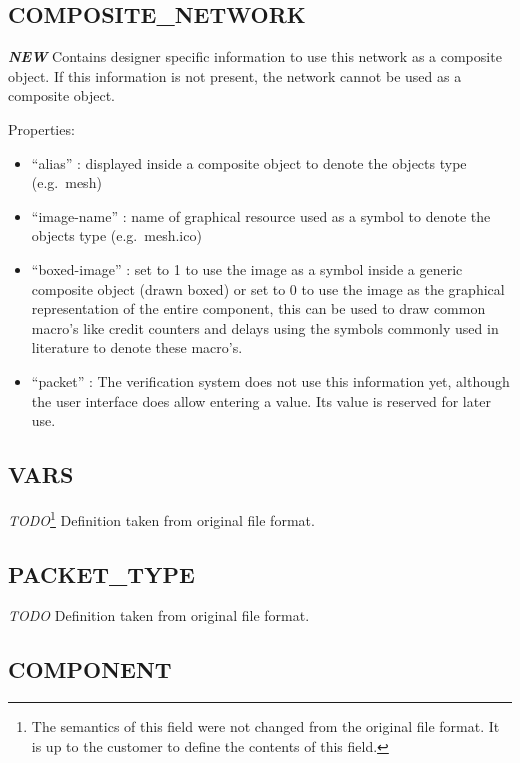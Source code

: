 \subsection{COMPOSITE\_NETWORK}\label{compositeux5fnetwork}

\textbf{\emph{NEW}} Contains designer specific information to use this
network as a composite object. If this information is not present, the
network cannot be used as a composite object.

Properties:

\begin{itemize}
\itemsep1pt\parskip0pt
\item
  ``alias'' : displayed inside a composite object to denote the objects
  type (e.g.~mesh)
\item
  ``image-name'' : name of graphical resource used as a symbol to denote
  the objects type (e.g.~mesh.ico)
\item
  ``boxed-image'' : set to 1 to use the image as a symbol inside a
  generic composite object (drawn boxed) or set to 0 to use the image as
  the graphical representation of the entire component, this can be used
  to draw common macro's like credit counters and delays using the
  symbols commonly used in literature to denote these macro's.
\item
  ``packet'' : The verification system does not use this information yet, 
  				although the user interface does allow entering a value.
  				Its value is reserved for later use.
\end{itemize}

\subsection{VARS}\label{vars}

\emph{TODO}\footnote{\label{fileformat-todo}The semantics of this field 
were not changed from the original file format.
It is up to the customer to define the contents of this field.}
Definition taken from original file format.

\subsection{PACKET\_TYPE}\label{packettype}

\emph{TODO}
Definition taken from original file format.

\subsection{COMPONENT}\label{component}

